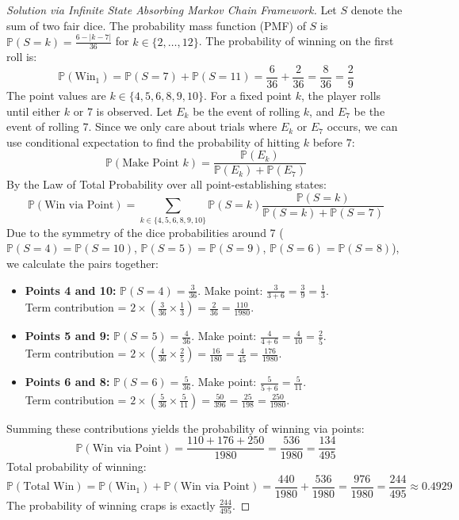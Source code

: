 \documentclass[11pt, letterpaper]{article}
\theoremstyle{definition}
\renewcommand{\P}{\mathbb{P}}
\begin{document}
\begin{proof}[Solution via Infinite State Absorbing Markov Chain Framework]
Let $S$ denote the sum of two fair dice. The probability mass function (PMF) of $S$ is $\P(S=k) = \frac{6 - |k-7|}{36}$ for $k \in \{2, \dots, 12\}$.
The probability of winning on the first roll is:
\[ \P(\text{Win}_1) = \P(S=7) + \P(S=11) = \frac{6}{36} + \frac{2}{36} = \frac{8}{36} = \frac{2}{9} \]
The point values are $k \in \{4, 5, 6, 8, 9, 10\}$. For a fixed point $k$, the player rolls until either $k$ or $7$ is observed. Let $E_k$ be the event of rolling $k$, and $E_7$ be the event of rolling $7$. Since we only care about trials where $E_k$ or $E_7$ occurs, we can use conditional expectation to find the probability of hitting $k$ before $7$:
\[ \P(\text{Make Point } k) = \frac{\P(E_k)}{\P(E_k) + \P(E_7)} \]
By the Law of Total Probability over all point-establishing states:
\[ \P(\text{Win via Point}) = \sum_{k \in \{4,5,6,8,9,10\}} \P(S = k) \frac{\P(S = k)}{\P(S = k) + \P(S = 7)} \]
Due to the symmetry of the dice probabilities around 7 ($\P(S=4)=\P(S=10)$, $\P(S=5)=\P(S=9)$, $\P(S=6)=\P(S=8)$), we calculate the pairs together:
\begin{itemize}
    \item \textbf{Points 4 and 10:} $\P(S=4) = \frac{3}{36}$. Make point: $\frac{3}{3+6} = \frac{3}{9} = \frac{1}{3}$. \\
    Term contribution = $2 \times \left(\frac{3}{36} \times \frac{1}{3}\right) = \frac{2}{36} = \frac{110}{1980}$.
    \item \textbf{Points 5 and 9:} $\P(S=5) = \frac{4}{36}$. Make point: $\frac{4}{4+6} = \frac{4}{10} = \frac{2}{5}$. \\
    Term contribution = $2 \times \left(\frac{4}{36} \times \frac{2}{5}\right) = \frac{16}{180} = \frac{4}{45} = \frac{176}{1980}$.
    \item \textbf{Points 6 and 8:} $\P(S=6) = \frac{5}{36}$. Make point: $\frac{5}{5+6} = \frac{5}{11}$. \\
    Term contribution = $2 \times \left(\frac{5}{36} \times \frac{5}{11}\right) = \frac{50}{396} = \frac{25}{198} = \frac{250}{1980}$.
\end{itemize}
Summing these contributions yields the probability of winning via points:
\[ \P(\text{Win via Point}) = \frac{110 + 176 + 250}{1980} = \frac{536}{1980} = \frac{134}{495} \]
Total probability of winning:
\[ \P(\text{Total Win}) = \P(\text{Win}_1) + \P(\text{Win via Point}) = \frac{440}{1980} + \frac{536}{1980} = \frac{976}{1980} = \frac{244}{495} \approx 0.4929 \]
The probability of winning craps is exactly $\frac{244}{495}$.
\end{proof}
\end{document}
